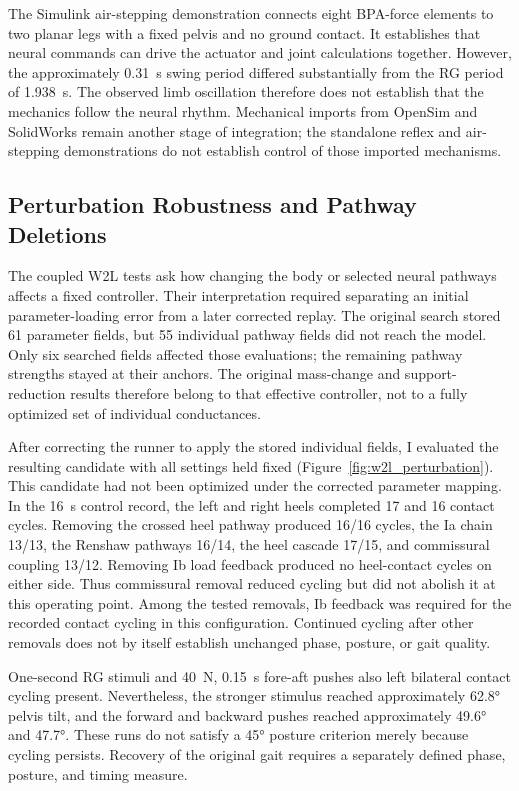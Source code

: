The Simulink air-stepping demonstration connects eight BPA-force elements to two planar legs with a fixed pelvis and no ground contact. It establishes that neural commands can drive the actuator and joint calculations together. However, the approximately \qty{0.31}{\second} swing period differed substantially from the RG period of \qty{1.938}{\second}. The observed limb oscillation therefore does not establish that the mechanics follow the neural rhythm. Mechanical imports from OpenSim and SolidWorks remain another stage of integration; the standalone reflex and air-stepping demonstrations do not establish control of those imported mechanisms.

\subsection{Perturbation Robustness and Pathway Deletions}\label{sec:w2l_perturbation}

The coupled W2L tests ask how changing the body or selected neural pathways affects a fixed controller. Their interpretation required separating an initial parameter-loading error from a later corrected replay. The original search stored 61 parameter fields, but 55 individual pathway fields did not reach the model. Only six searched fields affected those evaluations; the remaining pathway strengths stayed at their anchors. The original mass-change and support-reduction results therefore belong to that effective controller, not to a fully optimized set of individual conductances.

After correcting the runner to apply the stored individual fields, I evaluated the resulting candidate with all settings held fixed (Figure~\ref{fig:w2l_perturbation}). This candidate had not been optimized under the corrected parameter mapping. In the \qty{16}{\second} control record, the left and right heels completed 17 and 16 contact cycles. Removing the crossed heel pathway produced 16/16 cycles, the Ia chain 13/13, the Renshaw pathways 16/14, the heel cascade 17/15, and commissural coupling 13/12. Removing Ib load feedback produced no heel-contact cycles on either side. Thus commissural removal reduced cycling but did not abolish it at this operating point. Among the tested removals, Ib feedback was required for the recorded contact cycling in this configuration. Continued cycling after other removals does not by itself establish unchanged phase, posture, or gait quality.

One-second RG stimuli and \qty{40}{\newton}, \qty{0.15}{\second} fore-aft pushes also left bilateral contact cycling present. Nevertheless, the stronger stimulus reached approximately \ang{62.8} pelvis tilt, and the forward and backward pushes reached approximately \ang{49.6} and \ang{47.7}. These runs do not satisfy a \ang{45} posture criterion merely because cycling persists. Recovery of the original gait requires a separately defined phase, posture, and timing measure.

